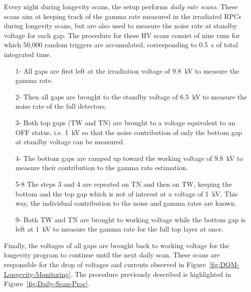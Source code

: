 	Every night during longevity scans, the setup performs \textit{daily rate scans}. These scans aim at keeping track of the gamma rate measured in the irradiated RPCs during longevity scans, but are also used to measure the noise rate at standby voltage for each gap. The procedure for these HV scans consist of nine runs for which 50,000 random triggers are accumulated, corresponding to \SI{0.5}{s} of total integrated time.
	
	\begin{itemize}
		\item[1-] All gaps are first left at the irradiation voltage of \SI{9.8}{kV} to measure the gamma rate.
		\item[2-] Then all gaps are brought to the standby voltage of \SI{6.5}{kV} to measure the noise rate of the full detectors.
		\item[3-] Both top gaps (TW and TN) are brought to a voltage equivalent to an OFF status, i.e. \SI{1}{kV} so that the noise contribution of only the bottom gap at standby voltage can be measured.
		\item[4-] The bottom gaps are ramped up toward the working voltage of \SI{9.8}{kV} to measure their contribution to the gamma rate estimation.
		\item[5-8] The steps 3 and 4 are repeated on TN and then on TW, keeping the bottom and the top gap which is not of interest at a voltage of \SI{1}{kV}. This way, the individual contribution to the noise and gamma rates are known.
		\item[9-] Both TW and TN are brought to working voltage while the bottom gap is left at \SI{1}{kV} to measure the gamma rate for the full top layer at once.
	\end{itemize}
	
	Finally, the voltages of all gaps are brought back to working voltage for the longevity program to continue until the next daily scan. These scans are responsible for the drop of voltages and currents observed in Figure~\ref{fig:DQM-Longevity-Monitoring}. The procedure previously described is highlighted in Figure~\ref{fig:Daily-Scan-Proc}. 
	
